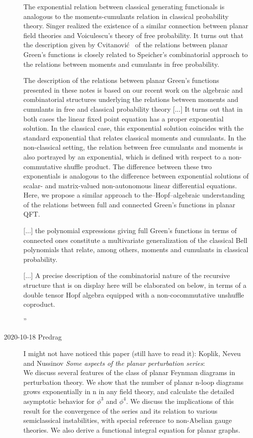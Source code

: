 \begin{description}
The exponential relation between classical generating functionals is
analogous to the moments-cumulants relation in classical probability
theory. Singer realized the existence of a similar connection
between planar field theories and Voiculescu's theory of free
probability. It turns out that the description given by
Cvitanovi\'c \etal\  of the relations between planar Green's functions is
closely related to Speicher's combinatorial approach to the relations
between moments and cumulants in free probability.

The description of the relations between planar Green's functions
presented in these notes is based on our recent work on the algebraic and
combinatorial structures underlying the relations between moments and
cumulants in free and classical probability theory
[...]
It turns out that in both cases the linear fixed point equation has a
proper exponential solution. In the classical case, this exponential
solution coincides with the standard exponential that relates classical
moments and cumulants. In the non-classical setting, the relation between
free cumulants and moments is also portrayed by an exponential, which is
defined with respect to a non-commutative shuffle product. The difference
between these two exponentials is analogous to the difference between
exponential solutions of scalar- and matrix-valued non-autonomous linear
differential equations. Here, we propose a similar approach to
the–Hopf–algebraic understanding of the relations between full and
connected Green's functions in planar QFT.

[...] the polynomial expressions giving full Green's functions in terms
of connected ones constitute a multivariate generalization of the
classical Bell polynomials that relate, among others, moments and
cumulants in classical probability.

[...]  A precise description of the combinatorial nature of the recursive
structure that is on display here will be elaborated on below, in terms
of a double tensor Hopf algebra equipped with a non-cocommutative
unshuffle coproduct.

''
\item[2020-10-18 Predrag]
I might not have noticed this paper (still have to read it):
Koplik, Neveu and Nussinov
{{\em Some aspects of the planar perturbation series}}:\\
We discuss several features of the class of planar Feynman diagrams in
perturbation theory. We show that the number of planar n-loop diagrams
grows exponentially in n in any field theory, and calculate the detailed
asymptotic behavior for $\phi^3$ and $\phi^4$. We discuss the
implications of this result for the convergence of the series and its
relation to various semiclassical instabilities, with special reference
to non-Abelian gauge theories. We also derive a functional integral
equation for planar graphs.


\end{description}
